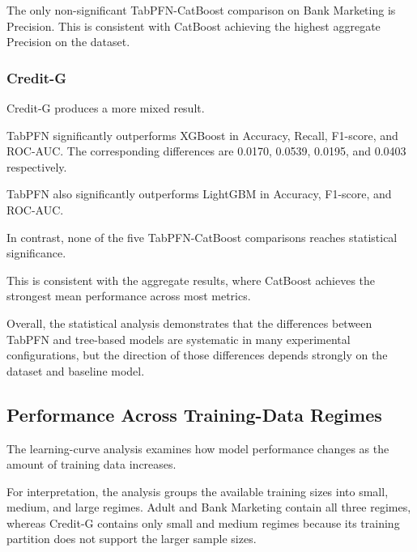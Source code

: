 The only non-significant TabPFN-CatBoost comparison on Bank Marketing is Precision. This is consistent with CatBoost achieving the highest aggregate Precision on the dataset.



\subsubsection{Credit-G}



Credit-G produces a more mixed result.



TabPFN significantly outperforms XGBoost in Accuracy, Recall, F1-score, and ROC-AUC. The corresponding differences are 0.0170, 0.0539, 0.0195, and 0.0403 respectively.



TabPFN also significantly outperforms LightGBM in Accuracy, F1-score, and ROC-AUC.



In contrast, none of the five TabPFN-CatBoost comparisons reaches statistical significance.



This is consistent with the aggregate results, where CatBoost achieves the strongest mean performance across most metrics.



Overall, the statistical analysis demonstrates that the differences between TabPFN and tree-based models are systematic in many experimental configurations, but the direction of those differences depends strongly on the dataset and baseline model.



\subsection{Performance Across Training-Data Regimes}



The learning-curve analysis examines how model performance changes as the amount of training data increases.



For interpretation, the analysis groups the available training sizes into small, medium, and large regimes. Adult and Bank Marketing contain all three regimes, whereas Credit-G contains only small and medium regimes because its training partition does not support the larger sample sizes.



